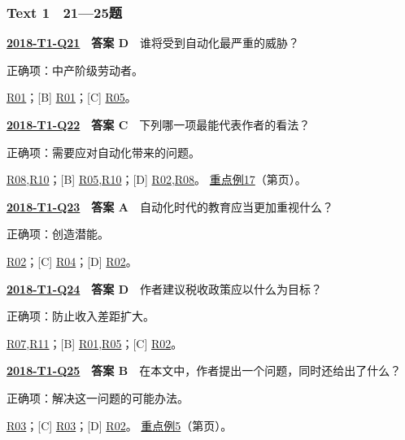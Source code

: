 \documentclass[11pt,a4paper]{article}
\begin{document}
\subsubsection{Text 1　21—25题}
\label{idx-2018-T1-Q21}
\noindent\textbf{\href{https://zj139.github.io/math-notes/english/d6ce3eaae72046cee9e0b423/\#q21}{2018-T1-Q21}　答案 D}　谁将受到自动化最严重的威胁？\par\nopagebreak
\noindent 正确项：中产阶级劳动者。\par\nopagebreak
\noindent [A] \hyperref[cat-R01]{R01}；[B] \hyperref[cat-R01]{R01}；[C] \hyperref[cat-R05]{R05}。
\par\smallskip
{}\label{idx-2018-T1-Q22}
\noindent\textbf{\href{https://zj139.github.io/math-notes/english/d6ce3eaae72046cee9e0b423/\#q22}{2018-T1-Q22}　答案 C}　下列哪一项最能代表作者的看法？\par\nopagebreak
\noindent 正确项：需要应对自动化带来的问题。\par\nopagebreak
\noindent [A] \hyperref[cat-R08]{R08},\hyperref[cat-R10]{R10}；[B] \hyperref[cat-R05]{R05},\hyperref[cat-R10]{R10}；[D] \hyperref[cat-R02]{R02},\hyperref[cat-R08]{R08}。
\hyperref[case-2018-T1-Q22]{重点例17}（第\pageref{case-2018-T1-Q22}页）。
\par\smallskip
{}\label{idx-2018-T1-Q23}
\noindent\textbf{\href{https://zj139.github.io/math-notes/english/d6ce3eaae72046cee9e0b423/\#q23}{2018-T1-Q23}　答案 A}　自动化时代的教育应当更加重视什么？\par\nopagebreak
\noindent 正确项：创造潜能。\par\nopagebreak
\noindent [B] \hyperref[cat-R02]{R02}；[C] \hyperref[cat-R04]{R04}；[D] \hyperref[cat-R02]{R02}。
\par\smallskip
{}\label{idx-2018-T1-Q24}
\noindent\textbf{\href{https://zj139.github.io/math-notes/english/d6ce3eaae72046cee9e0b423/\#q24}{2018-T1-Q24}　答案 D}　作者建议税收政策应以什么为目标？\par\nopagebreak
\noindent 正确项：防止收入差距扩大。\par\nopagebreak
\noindent [A] \hyperref[cat-R07]{R07},\hyperref[cat-R11]{R11}；[B] \hyperref[cat-R01]{R01},\hyperref[cat-R05]{R05}；[C] \hyperref[cat-R02]{R02}。
\par\smallskip
{}\label{idx-2018-T1-Q25}
\noindent\textbf{\href{https://zj139.github.io/math-notes/english/d6ce3eaae72046cee9e0b423/\#q25}{2018-T1-Q25}　答案 B}　在本文中，作者提出一个问题，同时还给出了什么？\par\nopagebreak
\noindent 正确项：解决这一问题的可能办法。\par\nopagebreak
\noindent [A] \hyperref[cat-R03]{R03}；[C] \hyperref[cat-R03]{R03}；[D] \hyperref[cat-R02]{R02}。
\hyperref[case-2018-T1-Q25]{重点例5}（第\pageref{case-2018-T1-Q25}页）。
\par\smallskip
\end{document}
